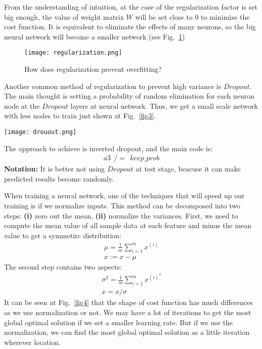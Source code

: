 \documentclass[a4paper]{article}
\begin{document}
From the understanding of intuition, at the case of the regularization factor is set big enough, the value of weight matrix $W$ will be set close to 0 to minimize the cost function. It is equivalent to eliminate the effects of many neurons, so the big neural network will become a smaller network (see Fig.~\ref{fig2})\\

\begin{figure}[hb]
\begin{center}
\texttt{[image: regularization.png]}
\end{center}
\caption{How does regularization prevent overfitting?}
\label{fig2}
\end{figure}

Another common method of regularization to prevent high variance is $Dropout$. The main thought is setting a probability of random elimination for each neuron node at the $Dropout$ layers at neural network. Thus, we get a small scale network with less nodes to train just shown at Fig.~\ref{fig3}.

\begin{figure*}
\begin{center}
\texttt{[image: drouout.png]}
\end{center}
\caption{Dropout regularization.}
\label{fig3}
\end{figure*}

The approach to achieve is inverted dropout, and the main code is:\\
\begin{gather}
a3 ~~/=~~ keep\_prob
\end{gather}
{\bf Notation:} It is better not using $Dropout$ at test stage, beacuse it can make predicted results become randomly.

When training a neural network, one of the techniques that will speed up our training is if we normalize inputs. This method can be decomposed into two steps: {\bf (i)} zero out the mean, {\bf (ii)} normalize the variances. First, we need to compute the mean value of all sample data at each feature and minus the mean value to get a symmetirc distribution:\\
\begin{gather}
\mu = \frac{1}{m}\sum_{i=1}^{m}x^{(i)}\\
x := x - \mu
\end{gather} 
The second step contains two aspects:\\
\begin{gather}
\sigma^2 = \frac{1}{m}\sum_{i=1}^m x^{{(i)}^2}\\
x = x / \sigma
\end{gather}
It can be seen at Fig.~\ref{fig4} that the shape of cost function has much differences as we use normalization or not. We may have a lot of iterations to get the most global optimal solution if we set a smaller learning rate. But if we use the normalization, we can find the most global optimal solution as a little iteration wherever location.
\end{document}
